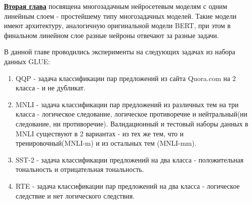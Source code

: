 \underline{\textbf{Вторая глава}} посвящена многозадачным нейросетевым моделям с одним линейным слоем - простейшему типу многозадачных моделей. Такие модели имеют архитектуру, аналогичную оригинальной модели BERT, при этом в финальном линейном слое разные нейроны отвечают за разные задачи.

В данной главе проводились эксперименты на следующих задачах из набора данных GLUE:
\begin{enumerate}
    \item QQP - задача классификации пар предложений из сайта Quora.com на 2 класса - и не дубликат.
    \item MNLI - задача классификации пар предложений из различных тем на три класса - логическое следование, логическое противоречие и нейтральный(ни следование, ни противоречие). Валидационный и тестовый наборы данных в MNLI существуют в 2 вариантах - из тех же тем, что и тренировочный(MNLI-m) и из остальных тем (MNLI-mm).
    \item SST-2 - задача классификации предложений на два класса - положительная тональность и отрицательная тональность.
    \item RTE - задача классификации пар предложений на два класса - логическое следствие и нет логического следствия.
\end{enumerate}

